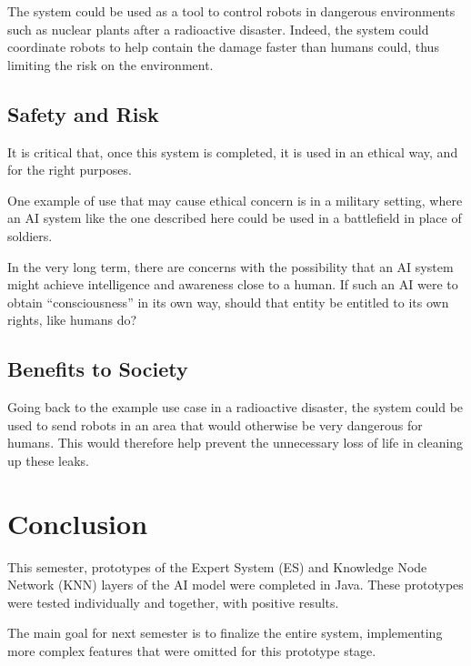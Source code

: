\documentclass[titlepage,11pt]{article}
\begin{document}
The system could be used as a tool to control robots in dangerous environments such as nuclear plants after a radioactive disaster. Indeed, the system could coordinate robots to help contain the damage faster than humans could, thus limiting the risk on the environment.

\subsection{Safety and Risk}

It is critical that, once this system is completed, it is used in an ethical way, and for the right purposes.

One example of use that may cause ethical concern is in a military setting, where an AI system like the one described here could be used in a battlefield in place of soldiers.

In the very long term, there are concerns with the possibility that an AI system might achieve intelligence and awareness close to a human. If such an AI were to obtain ``consciousness'' in its own way, should that entity be entitled to its own rights, like humans do?

\subsection{Benefits to Society}

Going back to the example use case in a radioactive disaster, the system could be used to send robots in an area that would otherwise be very dangerous for humans. This would therefore help prevent the unnecessary loss of life in cleaning up these leaks.

\section{Conclusion}

This semester, prototypes of the Expert System (ES) and Knowledge Node Network (KNN) layers of the AI model were completed in Java. These prototypes were tested individually and together, with positive results.

The main goal for next semester is to finalize the entire system, implementing more complex features that were omitted for this prototype stage.
\end{document}
